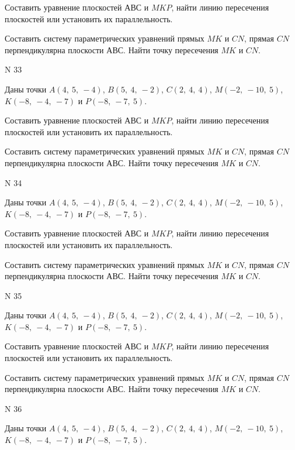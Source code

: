 \documentclass[11pt]{report}
\begin{document}
Составить уравнение плоскостей $АВС$ и $MKP$,
найти линию пересечения плоскостей или установить их параллельность.

Составить систему параметрических уравнений прямых $MK$ и $CN$,
прямая $CN$ перпендикулярна плоскости $АВС$. 
Найти точку пересечения $MK$ и $CN$.



 N 33

Даны точки $A\left( 4, \  5, \  -4\right)$, $B\left( 5, \  4, \  -2\right)$, $C\left( 2, \  4, \  4\right)$, $M\left( -2, \  -10, \  5\right)$, $K\left( -8, \  -4, \  -7\right)$ и $P\left( -8, \  -7, \  5\right)$.


Составить уравнение плоскостей $АВС$ и $MKP$,
найти линию пересечения плоскостей или установить их параллельность.

Составить систему параметрических уравнений прямых $MK$ и $CN$,
прямая $CN$ перпендикулярна плоскости $АВС$. 
Найти точку пересечения $MK$ и $CN$.



 N 34

Даны точки $A\left( 4, \  5, \  -4\right)$, $B\left( 5, \  4, \  -2\right)$, $C\left( 2, \  4, \  4\right)$, $M\left( -2, \  -10, \  5\right)$, $K\left( -8, \  -4, \  -7\right)$ и $P\left( -8, \  -7, \  5\right)$.


Составить уравнение плоскостей $АВС$ и $MKP$,
найти линию пересечения плоскостей или установить их параллельность.

Составить систему параметрических уравнений прямых $MK$ и $CN$,
прямая $CN$ перпендикулярна плоскости $АВС$. 
Найти точку пересечения $MK$ и $CN$.



 N 35

Даны точки $A\left( 4, \  5, \  -4\right)$, $B\left( 5, \  4, \  -2\right)$, $C\left( 2, \  4, \  4\right)$, $M\left( -2, \  -10, \  5\right)$, $K\left( -8, \  -4, \  -7\right)$ и $P\left( -8, \  -7, \  5\right)$.


Составить уравнение плоскостей $АВС$ и $MKP$,
найти линию пересечения плоскостей или установить их параллельность.

Составить систему параметрических уравнений прямых $MK$ и $CN$,
прямая $CN$ перпендикулярна плоскости $АВС$. 
Найти точку пересечения $MK$ и $CN$.



 N 36

Даны точки $A\left( 4, \  5, \  -4\right)$, $B\left( 5, \  4, \  -2\right)$, $C\left( 2, \  4, \  4\right)$, $M\left( -2, \  -10, \  5\right)$, $K\left( -8, \  -4, \  -7\right)$ и $P\left( -8, \  -7, \  5\right)$.
\end{document}
